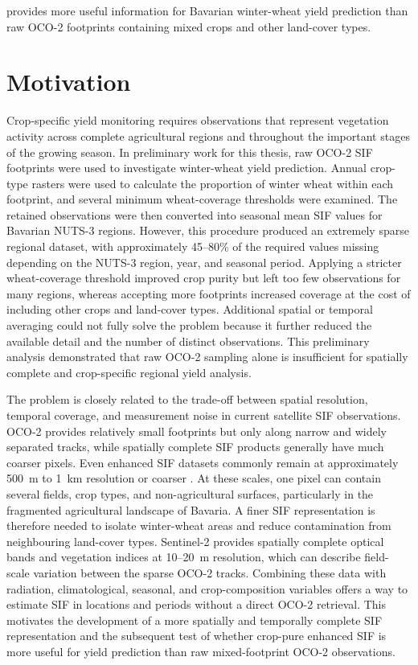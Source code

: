 provides more useful information for Bavarian winter-wheat yield prediction than raw OCO-2 footprints containing mixed crops and other land-cover types.

\section{Motivation}
Crop-specific yield monitoring requires observations that represent vegetation activity across complete agricultural regions and throughout the important stages of the growing season. In preliminary work for this thesis, raw OCO-2 SIF footprints were used to investigate winter-wheat yield prediction. Annual crop-type rasters were used to calculate the proportion of winter wheat within each footprint, and several minimum wheat-coverage thresholds were examined. The retained observations were then converted into seasonal mean SIF values for Bavarian NUTS-3 regions. However, this procedure produced an extremely sparse regional dataset, with approximately 45--80\% of the required values missing depending on the NUTS-3 region, year, and seasonal period. Applying a stricter wheat-coverage threshold improved crop purity but left too few observations for many regions, whereas accepting more footprints increased coverage at the cost of including other crops and land-cover types. Additional spatial or temporal averaging could not fully solve the problem because it further reduced the available detail and the number of distinct observations. This preliminary analysis demonstrated that raw OCO-2 sampling alone is insufficient for spatially complete and crop-specific regional yield analysis.

The problem is closely related to the trade-off between spatial resolution, temporal coverage, and measurement noise in current satellite SIF observations. OCO-2 provides relatively small footprints but only along narrow and widely separated tracks, while spatially complete SIF products generally have much coarser pixels. Even enhanced SIF datasets commonly remain at approximately 500~m to 1~km resolution or coarser \cite{gensheimer2022convolutional,du2025cnsif}. At these scales, one pixel can contain several fields, crop types, and non-agricultural surfaces, particularly in the fragmented agricultural landscape of Bavaria. A finer SIF representation is therefore needed to isolate winter-wheat areas and reduce contamination from neighbouring land-cover types. Sentinel-2 provides spatially complete optical bands and vegetation indices at 10--20~m resolution, which can describe field-scale variation between the sparse OCO-2 tracks. Combining these data with radiation, climatological, seasonal, and crop-composition variables offers a way to estimate SIF in locations and periods without a direct OCO-2 retrieval. This motivates the development of a more spatially and temporally complete SIF representation and the subsequent test of whether crop-pure enhanced SIF is more useful for yield prediction than raw mixed-footprint OCO-2 observations.


